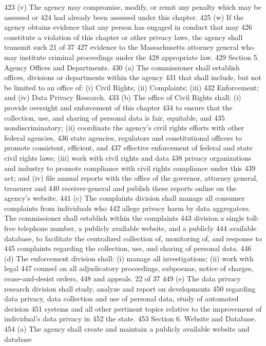 423 (v) The agency may compromise, modify, or remit any penalty which may be assessed or
424 had already been assessed under this chapter.
425 (w) If the agency obtains evidence that any person has engaged in conduct that may
426 constitute a violation of this chapter or other privacy laws, the agency shall transmit such
21 of 37
427 evidence to the Massachusetts attorney general who may institute criminal proceedings under the
428 appropriate law.
429 Section 5. Agency Offices and Departments.
430 (a) The commissioner shall establish offices, divisions or departments within the agency
431 that shall include, but not be limited to an office of: (i) Civil Rights; (ii) Complaints; (iii)
432 Enforcement; and (iv) Data Privacy Research.
433 (b) The office of Civil Rights shall: (i) provide oversight and enforcement of this chapter
434 to ensure that the collection, use, and sharing of personal data is fair, equitable, and
435 nondiscriminatory; (ii) coordinate the agency’s civil rights efforts with other federal agencies,
436 state agencies, regulators and constitutional officers to promote consistent, efficient, and
437 effective enforcement of federal and state civil rights laws; (iii) work with civil rights and data
438 privacy organizations and industry to promote compliance with civil rights compliance under this
439 act; and (iv) file annual reports with the office of the governor, attorney general, treasurer and
440 receiver-general and publish these reports online on the agency’s website.
441 (c) The complaints division shall manage all consumer complaints from individuals who
442 allege privacy harm by data aggregators. The commissioner shall establish within the complaints
443 division a single toll-free telephone number, a publicly available website, and a publicly
444 available database, to facilitate the centralized collection of, monitoring of, and response to
445 complaints regarding the collection, use, and sharing of personal data.
446 (d) The enforcement division shall: (i) manage all investigations; (ii) work with legal
447 counsel on all adjudicatory proceedings, subpoenas, notice of charges, cease-and-desist orders,
448 and appeals.
22 of 37
449 (e) The data privacy research division shall study, analyze and report on developments
450 regarding data privacy, data collection and use of personal data, study of automated decision
451 systems and all other pertinent topics relative to the improvement of individual’s data privacy in
452 the state.
453 Section 6. Website and Database.
454 (a) The agency shall create and maintain a publicly available website and database
